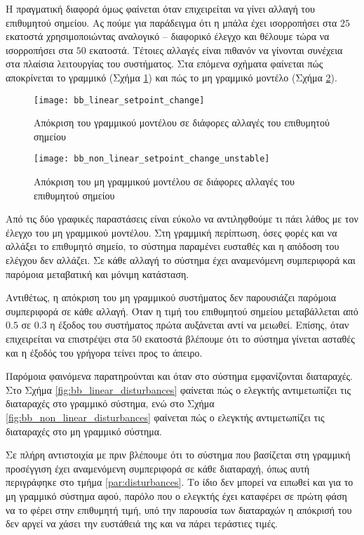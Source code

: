 Η πραγματική διαφορά όμως φαίνεται όταν επιχειρείται να γίνει αλλαγή του επιθυμητού σημείου. Ας πούμε για παράδειγμα ότι η μπάλα έχει ισορροπήσει στα $25$ εκατοστά χρησιμοποιώντας αναλογικό -- διαφορικό έλεγχο και θέλουμε τώρα να ισορροπήσει στα $50$ εκατοστά. Τέτοιες αλλαγές είναι πιθανόν να γίνονται συνέχεια στα πλαίσια λειτουργίας του συστήματος. Στα επόμενα σχήματα φαίνεται πώς αποκρίνεται το γραμμικό (Σχήμα \ref{fig:bb_linear_setpoint_change}) και πώς το μη γραμμικό μοντέλο (Σχήμα \ref{fig:bb_non_linear_setpoint_change_unstable}).

\begin{figure}[h]
  \centering
  \texttt{[image: bb\_linear\_setpoint\_change]}
  \caption{Απόκριση του γραμμικού μοντέλου σε διάφορες αλλαγές του επιθυμητού σημείου}
  \label{fig:bb_linear_setpoint_change}
\end{figure}

\begin{figure}[h]
  \centering
  \texttt{[image: bb\_non\_linear\_setpoint\_change\_unstable]}
  \caption{Απόκριση του μη γραμμικού μοντέλου σε διάφορες αλλαγές του επιθυμητού σημείου}
  \label{fig:bb_non_linear_setpoint_change_unstable}
\end{figure}

Από τις δύο γραφικές παραστάσεις είναι εύκολο να αντιληφθούμε τι πάει λάθος με τον έλεγχο του μη γραμμικού μοντέλου. Στη γραμμική περίπτωση, όσες φορές και να αλλάξει το επιθυμητό σημείο, το σύστημα παραμένει ευσταθές και η απόδοση του ελέγχου δεν αλλάζει. Σε κάθε αλλαγή το σύστημα έχει αναμενόμενη συμπεριφορά και παρόμοια μεταβατική και μόνιμη κατάσταση.\newpage

Αντιθέτως, η απόκριση του μη γραμμικού συστήματος δεν παρουσιάζει παρόμοια συμπεριφορά σε κάθε αλλαγή. Όταν η τιμή του επιθυμητού σημείου μεταβάλλεται από $0.5$ σε $0.3$ η έξοδος του συστήματος πρώτα αυξάνεται αντί να μειωθεί. Επίσης, όταν επιχειρείται να επιστρέψει στα $50$ εκατοστά βλέπουμε ότι το σύστημα γίνεται ασταθές και η έξοδός του γρήγορα τείνει προς το άπειρο.

Παρόμοια φαινόμενα παρατηρούνται και όταν στο σύστημα εμφανίζονται διαταραχές. Στο Σχήμα \ref{fig:bb_linear_disturbances} φαίνεται πώς ο ελεγκτής αντιμετωπίζει τις διαταραχές στο γραμμικό σύστημα, ενώ στο Σχήμα \ref{fig:bb_non_linear_disturbances} φαίνεται πώς ο ελεγκτής αντιμετωπίζει τις διαταραχές στο μη γραμμικό σύστημα.

Σε πλήρη αντιστοιχία με πριν βλέπουμε ότι το σύστημα που βασίζεται στη γραμμική προσέγγιση έχει αναμενόμενη συμπεριφορά σε κάθε διαταραχή, όπως αυτή περιγράφηκε στο τμήμα \ref{par:disturbances}. Το ίδιο δεν μπορεί να ειπωθεί και για το μη γραμμικό σύστημα αφού, παρόλο που ο ελεγκτής έχει καταφέρει σε πρώτη φάση να το φέρει στην επιθυμητή τιμή, υπό την παρουσία των διαταραχών η απόκρισή του δεν αργεί να χάσει την ευστάθειά της και να πάρει τεράστιες τιμές.

